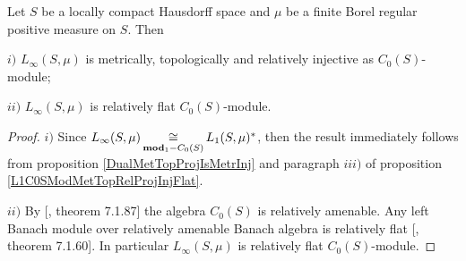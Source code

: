 \begin{proposition}\label{LinftyC0SModMetTopRelProjIngFlat}
Let $S$ be a locally compact Hausdorff space and $\mu$ be a finite Borel regular positive measure on $S$. Then

$i)$ $L_\infty(S,\mu)$ is metrically, topologically and relatively injective as $C_0(S)$-module;

$ii)$ $L_\infty(S,\mu)$ is relatively flat $C_0(S)$-module.
\end{proposition}
\begin{proof} $i)$ Since $L_\infty(S,\mu)\mathop{\mathbin{\cong}}\limits_{\mathbf{mod}_1-C_0(S)}L_1(S,\mu)^*$, then the result immediately follows from proposition \ref{DualMetTopProjIsMetrInj} and paragraph $iii)$ of proposition \ref{L1C0SModMetTopRelProjInjFlat}.

$ii)$ By [\cite{HelBanLocConvAlg}, theorem 7.1.87] the algebra $C_0(S)$ is relatively amenable. Any left Banach module over relatively amenable Banach algebra is relatively flat [\cite{HelBanLocConvAlg}, theorem 7.1.60]. In particular $L_\infty(S,\mu)$ is relatively flat $C_0(S)$-module.
\end{proof}


